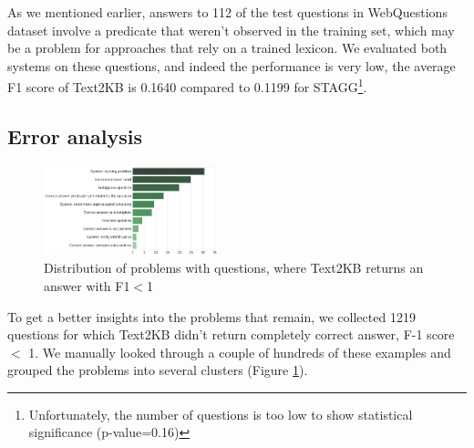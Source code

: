 As we mentioned earlier, answers to 112 of the test questions in WebQuestions dataset involve a predicate that weren't observed in the training set, which may be a problem for approaches that rely on a trained lexicon.
We evaluated both systems on these questions, and indeed the performance is very low, \ie the average F1 score of Text2KB is 0.1640 compared to 0.1199 for STAGG\footnote{Unfortunately, the number of questions is too low to show statistical significance (p-value=0.16)}.

\subsection{Error analysis}
\label{section:analysis:error}

\begin{figure}
\centering
\includegraphics[width=0.45\textwidth]{img/error_analysis}
\vspace{-0.5cm}
\caption{Distribution of problems with questions, where Text2KB returns an answer with F1$<$1}
\label{fig:error_analysis}
\vspace{-0.3cm}
\end{figure}

To get a better insights into the problems that remain, we collected 1219 questions for which Text2KB didn't return completely correct answer, \ie F-1 score $<$ 1.
We manually looked through a couple of hundreds of these examples and grouped the problems into several clusters (Figure \ref{fig:error_analysis}).

